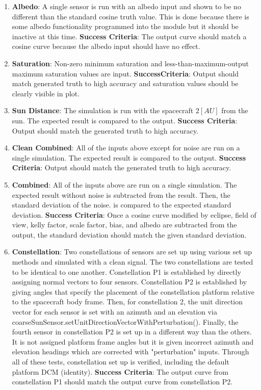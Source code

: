 \begin{enumerate}
	\item\textbf{Albedo}: A single sensor is run with an albedo input and shown to be no different than the standard cosine truth value. This is done because there is some albedo functionality programmed into the module but it should be inactive at this time.
	\subitem \textbf{Success Criteria}: The output curve should match a cosine curve because the albedo input should have no effect.
	\item \textbf{Saturation}: Non-zero minimum saturation and less-than-maximum-output maximum saturation values are input.
	\subitem\textbf{SuccessCriteria}: Output should match generated truth to high accuracy and saturation values should be clearly visible in plot.
	\item\textbf{Sun Distance}: The simulation is run with the spacecraft $2[AU]$ from the sun. The expected result is compared to the output.
	\subitem \textbf{Success Criteria}: Output should match the generated truth to high accuracy.
	\item\textbf{Clean Combined}: All of the inputs above except for noise are run on a single simulation. The expected result is compared to the output.
	\subitem \textbf{Success Criteria}: Output should match the generated truth to high accuracy.
	\item\textbf{Combined}: All of the inputs above are run on a single simulation. The expected result without noise is subtracted from the result. Then, the standard deviation of the noise. is compared to the expected standard deviation.
	\subitem \textbf{Success Criteria}: Once a cosine curve modified by eclipse, field of view, kelly factor, scale factor, bias, and albedo are subtracted from the output, the standard deviation should match the given standard deviation.
	\item\textbf{Constellation}: Two constellations of sensors are set up using various set up methods and simulated with a clean signal. The two constellations are tested to be identical to one another. Constellation P1 is established by directly assigning normal vectors to four sensors. Constellation P2 is established by giving angles that specify the placement of the constellation platform relative to the spacecraft body frame. Then, for constellation 2, the unit direction vector for each sensor is set with an azimuth and an elevation via coarseSunSensor.setUnitDirectionVectorWithPerturbation(). Finally, the fourth sensor in constellation P2 is set up in a different way than the others. It is not assigned platform frame angles but it is given incorrect azimuth and elevation headings which are corrected with "perturbation" inputs. Through all of these tests, constellation set up is verified, including the default platform DCM (identity).
	\subitem \textbf{Success Criteria}: The output curve from constellation P1 should match the output curve from constellation P2.
\end{enumerate}


